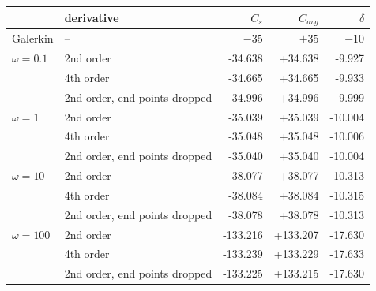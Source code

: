 \begin{tabular}{llrrr}\toprule & derivative & $C_s$ & $C_{avg}$ & $\delta$\\\midrule
Galerkin & -- & $-35$ & $+35$ & $-10$\\\midrule
$\omega=0.1$ & 2nd order & -34.638 & +34.638 & -9.927\\
 & 4th order & -34.665 & +34.665 & -9.933\\
 & 2nd order, end points dropped & -34.996 & +34.996 & -9.999\\
\addlinespace
$\omega=1$ & 2nd order & -35.039 & +35.039 & -10.004\\
 & 4th order & -35.048 & +35.048 & -10.006\\
 & 2nd order, end points dropped & -35.040 & +35.040 & -10.004\\
\addlinespace
$\omega=10$ & 2nd order & -38.077 & +38.077 & -10.313\\
 & 4th order & -38.084 & +38.084 & -10.315\\
 & 2nd order, end points dropped & -38.078 & +38.078 & -10.313\\
\addlinespace
$\omega=100$ & 2nd order & -133.216 & +133.207 & -17.630\\
 & 4th order & -133.239 & +133.229 & -17.633\\
 & 2nd order, end points dropped & -133.225 & +133.215 & -17.630\\
\bottomrule\end{tabular}